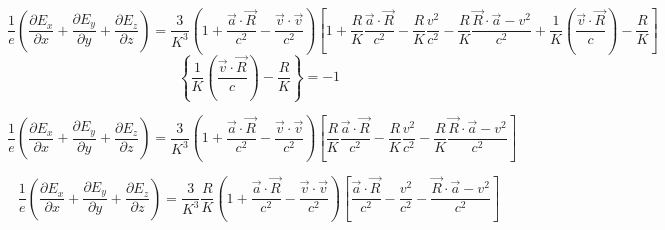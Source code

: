 \documentclass[11pt]{article}
\begin{document}
\[\frac{1}{e}\left( \frac{\partial {{E}_{x}}}{\partial x}+\frac{\partial {{E}_{y}}}{\partial y}+\frac{\partial {{E}_{z}}}{\partial z} \right)=\frac{3}{{{K}^{3}}}\left( 1+\frac{\overrightarrow{a}\cdot \overrightarrow{R}}{{{c}^{2}}}-\frac{\overrightarrow{v}\cdot \overrightarrow{v}}{{{c}^{2}}} \right)\left[ 1+\frac{R}{K}\frac{\overrightarrow{a}\cdot \overrightarrow{R}}{{{c}^{2}}}-\frac{R}{K}\frac{{{v}^{2}}}{{{c}^{2}}}-\frac{R}{K}\frac{\overrightarrow{R}\cdot \overrightarrow{a}-{{v}^{2}}}{{{c}^{2}}}+\frac{1}{K}\left( \frac{\overrightarrow{v}\cdot \overrightarrow{R}}{c} \right)-\frac{R}{K} \right]\]
\[\left\{ \frac{1}{K}\left( \frac{\overrightarrow{v}\cdot \overrightarrow{R}}{c} \right)-\frac{R}{K} \right\}=-1\]

\[\frac{1}{e}\left( \frac{\partial {{E}_{x}}}{\partial x}+\frac{\partial {{E}_{y}}}{\partial y}+\frac{\partial {{E}_{z}}}{\partial z} \right)=\frac{3}{{{K}^{3}}}\left( 1+\frac{\overrightarrow{a}\cdot \overrightarrow{R}}{{{c}^{2}}}-\frac{\overrightarrow{v}\cdot \overrightarrow{v}}{{{c}^{2}}} \right)\left[ \frac{R}{K}\frac{\overrightarrow{a}\cdot \overrightarrow{R}}{{{c}^{2}}}-\frac{R}{K}\frac{{{v}^{2}}}{{{c}^{2}}}-\frac{R}{K}\frac{\overrightarrow{R}\cdot \overrightarrow{a}-{{v}^{2}}}{{{c}^{2}}} \right]\]

\[\frac{1}{e}\left( \frac{\partial {{E}_{x}}}{\partial x}+\frac{\partial {{E}_{y}}}{\partial y}+\frac{\partial {{E}_{z}}}{\partial z} \right)=\frac{3}{{{K}^{3}}}\frac{R}{K}\left( 1+\frac{\overrightarrow{a}\cdot \overrightarrow{R}}{{{c}^{2}}}-\frac{\overrightarrow{v}\cdot \overrightarrow{v}}{{{c}^{2}}} \right)\left[ \frac{\overrightarrow{a}\cdot \overrightarrow{R}}{{{c}^{2}}}-\frac{{{v}^{2}}}{{{c}^{2}}}-\frac{\overrightarrow{R}\cdot \overrightarrow{a}-{{v}^{2}}}{{{c}^{2}}} \right]\]
\end{document}
